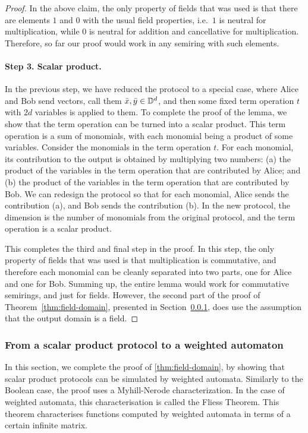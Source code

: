 \begin{proof}
 In the above claim, the only property of fields that was used is that there are elements $1$ and $0$ with the usual field properties, i.e.~$1$ is neutral for multiplication, while $0$ is neutral for addition and cancellative for multiplication. Therefore, so far our proof would work in any semiring with such elements.

 \paragraph*{Step 3. Scalar product.} In the previous step, we have reduced the protocol to a special case, where Alice and Bob send vectors, call them $\bar x, \bar y \in \mathbb D^d$, and then some fixed term operation $t$ with $2d$ variables is applied to them. 
  To complete the proof of the lemma, we show that the term operation can be turned into a scalar product. This term operation is a sum of monomials, with each monomial being a product of some variables. Consider the monomials in the term operation $t$. For each monomial, its contribution to the output  is obtained by multiplying two numbers: (a) the product of the  variables in the term operation that are contributed by Alice; and   (b) the product of the variables in the term operation that are contributed by Bob. We can redesign the protocol so that for each monomial, Alice sends the contribution (a), and Bob sends the contribution (b). In the new protocol, the dimension is the number of monomials from the original protocol, and the term operation is a scalar product. 

  This completes the third and final step in the proof. In this step, the only property of fields that was used is that multiplication is commutative, and therefore each monomial can be cleanly separated into two parts, one for Alice and one for Bob. Summing up, the entire lemma would work for commutative semirings, and just for fields. However, the second part of the proof of Theorem~\ref{thm:field-domain}, presented in Section~\ref{sec:from-scalar-product-protocol-to-weighted-automaton}, does use the assumption  that the output domain is a field.
\end{proof}

\subsubsection{From a scalar product protocol to a weighted automaton}
\label{sec:from-scalar-product-protocol-to-weighted-automaton}
In this section, we complete the proof of \cref{thm:field-domain}, by showing that scalar product protocols can be simulated by weighted automata. Similarly to the Boolean case, the proof  uses a Myhill-Nerode characterization. In the case of weighted automata, this characterisation is called  the Fliess Theorem. This theorem  characterises functions computed by weighted automata in terms of a certain infinite matrix.

